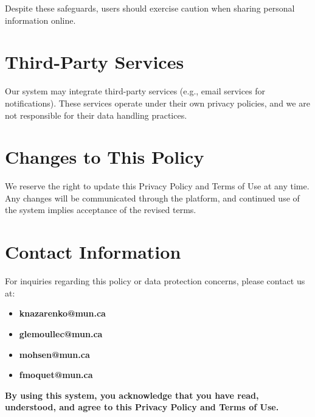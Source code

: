 \documentclass[a4paper,12pt]{article}
\begin{document}
Despite these safeguards, users should exercise caution when sharing personal information online.

\section{Third-Party Services}
Our system may integrate third-party services (e.g., email services for notifications). These services operate under their own privacy policies, and we are not responsible for their data handling practices.

\section{Changes to This Policy}
We reserve the right to update this Privacy Policy and Terms of Use at any time. Any changes will be communicated through the platform, and continued use of the system implies acceptance of the revised terms.

\section{Contact Information}
For inquiries regarding this policy or data protection concerns, please contact us at:
\begin{itemize}
    \item \textbf{knazarenko@mun.ca}
    \item \textbf{glemoullec@mun.ca}
    \item \textbf{mohsen@mun.ca}
    \item \textbf{fmoquet@mun.ca}
\end{itemize}

\textbf{By using this system, you acknowledge that you have read, understood, and agree to this Privacy Policy and Terms of Use.}
\end{document}
